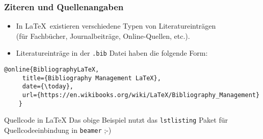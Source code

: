 \begin{frame}[fragile]
	\frametitle{Ziteren und Quellenangaben}
	
	\begin{itemize}
		\item In \LaTeX~existieren verschiedene Typen von Literatureinträgen\\ (für Fachbücher, Journalbeiträge, Online-Quellen, etc.).
		\item Literatureinträge in der \texttt{.bib} Datei haben die folgende Form:
	\end{itemize}
	
	\begin{lstlisting}[caption={Literatureintrag in \texttt{.bib} Datei},captionpos=b]
	@online{BibliographyLaTeX,
	 title={Bibliography Management LaTeX},
	 date={\today},
	 url={https://en.wikibooks.org/wiki/LaTeX/Bibliography_Management}
	}
	\end{lstlisting}
	
	\begin{exampleblock}{Quellcode in \LaTeX}
		Das obige Beispiel nutzt das \texttt{lstlisting} Paket für Quellcodeeinbindung in \texttt{beamer} ;-)
	\end{exampleblock}
	
\end{frame}
